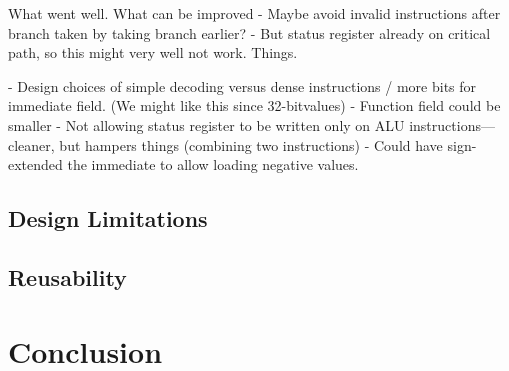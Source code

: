 \documentclass[11pt]{article}
\begin{document}
What went well.
What can be improved
- Maybe avoid invalid instructions after branch taken by taking branch earlier?
-  But status register already on critical path, so this might very well not work.
Things.

- Design choices of simple decoding versus dense instructions / more bits for immediate field. (We might like this since 32-bitvalues)
- Function field could be smaller
- Not allowing status register to be written only on ALU instructions---cleaner, but hampers things (combining two instructions)
- Could have sign-extended the immediate to allow loading negative values.

\subsection{Design Limitations}
\label{subsec:limitations}

\subsection{Reusability}
\label{subsec:reusability}


\section{Conclusion}
\label{sec:conclusion}
\end{document}
